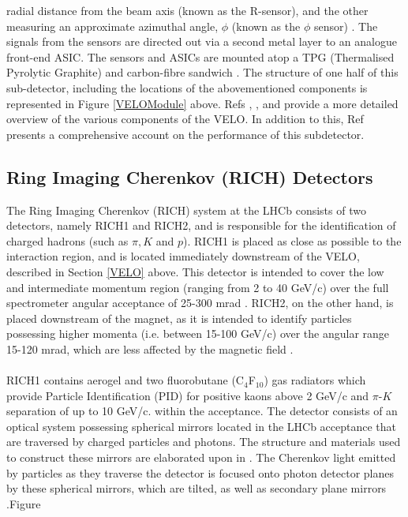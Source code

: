 radial distance from the beam axis (known as the R-sensor), and the other measuring an approximate azimuthal angle, $\phi$ (known as the $\phi$ sensor) \cite{Kopciewicz_2022}. The signals from the sensors are directed out via a second metal layer to an analogue front-end ASIC. The sensors and ASICs are mounted atop a TPG (Thermalised Pyrolytic Graphite) and carbon-fibre sandwich \cite{EKLUND200572}. The structure of one half of this sub-detector, including the locations of the abovementioned components is represented in Figure \ref{VELOModule} above. Refs \cite{Aaij_2014}, \cite{EKLUND200572}, and \cite{Kopciewicz_2022} provide a more detailed overview of the various components of the VELO. In addition to this, Ref \cite{Aaij_2014} presents a comprehensive account on the performance of this subdetector.

\subsection{Ring Imaging Cherenkov (RICH) Detectors}
The Ring Imaging Cherenkov (RICH) system at the LHCb consists of two detectors, namely RICH1 and RICH2, and is responsible for the identification of charged hadrons (such as $\pi, K$ and $p$). RICH1 is placed as close as possible to the interaction region, and is located immediately downstream of the VELO, described in Section \ref{VELO} above. This detector is intended to cover the low and intermediate momentum region (ranging from 2 to 40 GeV/c) over the full spectrometer angular acceptance of 25-300 mrad \cite{Adinolfi_2013}. RICH2, on the other hand, is placed downstream of the magnet, as it is intended to
identify particles possessing higher momenta (i.e. between 15-100 GeV/c) over the angular range 15-120 mrad, which are less affected by the magnetic field \cite{Adinolfi_2013}.\\
\\
RICH1 contains aerogel and two fluorobutane (C$_{4}$F$_{10}$) gas radiators which provide Particle Identification (PID) for positive kaons above 2 GeV/c and $\pi$-$K$ separation of up to 10 GeV/c.  within the acceptance. The detector consists of an optical system possessing spherical mirrors located in the LHCb acceptance that are traversed by charged particles and photons. The structure and materials used to construct these mirrors are elaborated upon in \cite{Antunes-Nobrega:630827}. The Cherenkov light emitted by particles as they traverse the detector is focused onto photon detector planes by these spherical mirrors, which are tilted, as well as secondary plane mirrors \cite{Antunes-Nobrega:630827}.Figure 
